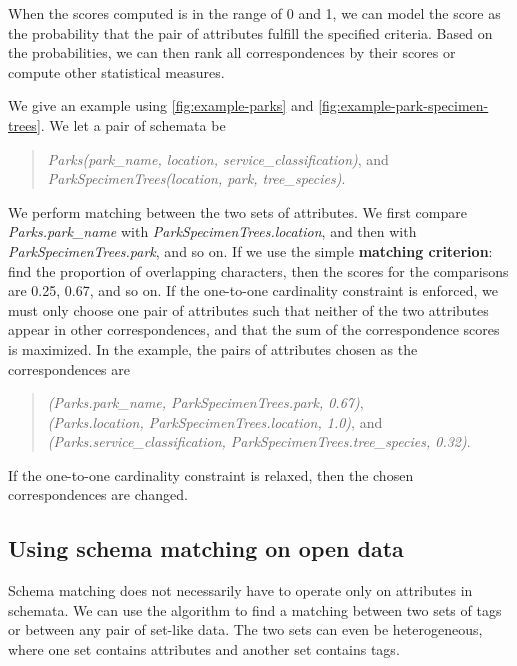 When the scores computed is in the range of 0 and 1, we can model the score as the probability that the pair of attributes fulfill the specified criteria. Based on the probabilities, we can then rank all correspondences by their scores or compute other statistical measures.

We give an example using \autoref{fig:example-parks} and \autoref{fig:example-park-specimen-trees}. We let a pair of schemata be
\begin{quote}
    \textit{Parks(park\_name, location, service\_classification)}, and \\
    \textit{ParkSpecimenTrees(location, park, tree\_species)}.
\end{quote}

We perform matching between the two sets of attributes. We first compare \textit{Parks.park\_name} with \textit{ParkSpecimenTrees.location}, and then with \textit{ParkSpecimenTrees.park}, and so on. If we use the simple \textbf{\gls{matching criterion}}: find the proportion of overlapping characters, then the scores for the comparisons are 0.25, 0.67, and so on. If the one-to-one cardinality constraint is enforced, we must only choose one pair of attributes such that neither of the two attributes appear in other correspondences, and that the sum of the correspondence scores is maximized. In the example, the pairs of attributes chosen as the correspondences are
\begin{quote}
\textit{(Parks.park\_name, ParkSpecimenTrees.park, 0.67)}, \\
\textit{(Parks.location, ParkSpecimenTrees.location, 1.0)}, and \\
\textit{(Parks.service\_classification, ParkSpecimenTrees.tree\_species, 0.32)}.
\end{quote}
If the one-to-one cardinality constraint is relaxed, then the chosen correspondences are changed.

\subsection{Using schema matching on open data}
\label{ssec:UsingSchemaMatchingOnOpenData}

Schema matching does not necessarily have to operate only on attributes in schemata. We can use the algorithm to find a matching between two sets of tags or between any pair of set-like data. The two sets can even be heterogeneous, where one set contains attributes and another set contains tags.


